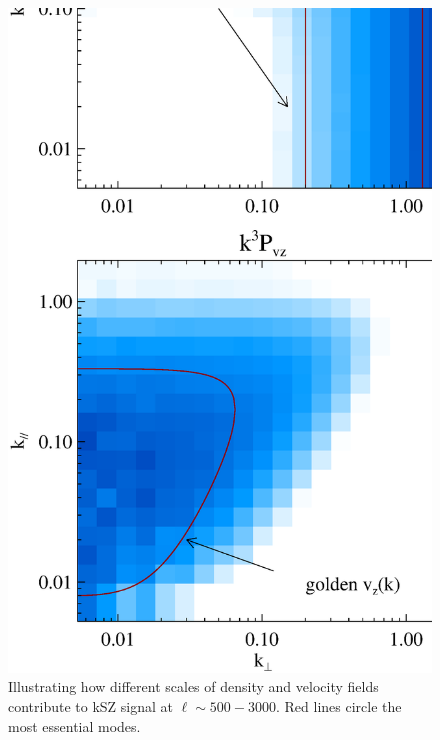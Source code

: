 \begin{figure}
\captionsetup{width=0.25\linewidth,justification=raggedright}
\begin{minipage}[t]{0.3\linewidth}
\begin{center}
\includegraphics[width=\textwidth,height=1.7\textwidth]{figure/k3pd_k3pv_z1_note.eps}
\end{center}
\vspace{-0.7cm}
\caption{
    Illustrating how different scales of density and velocity 
    fields contribute to kSZ signal at $\ell\sim 500-3000$. 
    Red lines circle the most essential modes. 
}
\end{minipage}
\end{figure}
